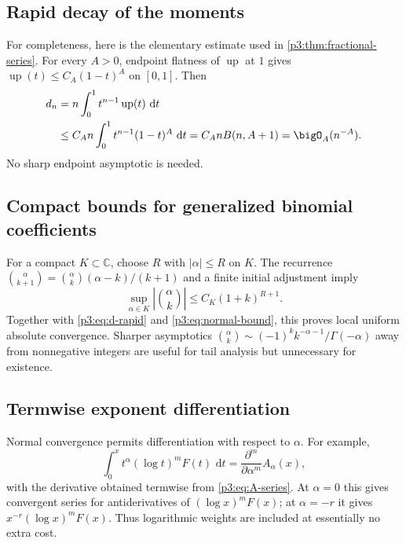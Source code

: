 \documentclass[11pt,oneside]{article}
\theoremstyle{definition}
\theoremstyle{remark}
\newcommand{\Up}{\operatorname{up}}
\newcommand{\C}{\mathbb C}
\newcommand{\dd}{\,\mathrm d}
\newcommand{\1}{\mathbf 1}
\begin{document}
\subsection{Rapid decay of the moments}

For completeness, here is the elementary estimate used in \cref{p3:thm:fractional-series}.
For every $A>0$, endpoint flatness of $\Up$ at $1$ gives
$\Up(t)\le C_A(1-t)^A$ on $[0,1]$.  Then
\begin{align}
 d_n
 &=n\int_0^1t^{n-1}\Up(t)\,\dd t\\
 &\le C_An\int_0^1t^{n-1}(1-t)^A\,\dd t
 =C_AnB(n,A+1)=\bigO_A(n^{-A}).                              \label{p3:eq:rapid-proof}
\end{align}
No sharp endpoint asymptotic is needed.

\subsection{Compact bounds for generalized binomial coefficients}

For a compact $K\subset\C$, choose $R$ with $|\alpha|\le R$ on $K$.  The recurrence
\(
\binom\alpha{k+1}=\binom\alpha k(\alpha-k)/(k+1)
\)
and a finite initial adjustment imply
\begin{equation}
 \sup_{\alpha\in K}|\binom\alpha k|\le C_K(1+k)^{R+1}.        \label{p3:eq:binom-compact}
\end{equation}
Together with \eqref{p3:eq:d-rapid} and \eqref{p3:eq:normal-bound}, this proves local uniform
absolute convergence.  Sharper asymptotics
$\binom\alpha k\sim(-1)^kk^{-\alpha-1}/\Gamma(-\alpha)$ away from nonnegative integers are
useful for tail analysis but unnecessary for existence.

\subsection{Termwise exponent differentiation}

Normal convergence permits differentiation with respect to $\alpha$.  For example,
\begin{equation}
 \int_0^xt^\alpha(\log t)^mF(t)\,\dd t
 =\frac{\partial^m}{\partial\alpha^m}A_\alpha(x),             \label{p3:eq:log-powers}
\end{equation}
with the derivative obtained termwise from \eqref{p3:eq:A-series}.  At $\alpha=0$ this gives
convergent series for antiderivatives of $(\log x)^mF(x)$; at $\alpha=-r$ it gives
$x^{-r}(\log x)^mF(x)$.  Thus logarithmic weights are included at essentially no extra cost.
\end{document}
